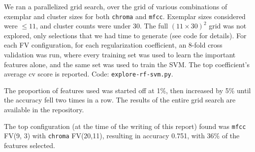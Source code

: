 \documentclass[9pt]{article}
\begin{document}
We ran a parallelized grid search, over the grid of various combinations of exemplar and cluster sizes for both \texttt{chroma} and \texttt{mfcc}. Exemplar sizes considered were $\le 11$, and cluster counts were under 30. The full $(11\times 30)^2$ grid was not explored, only selections that we had time to generate (see code for details). For each FV configuration, for each regularization coefficient, an 8-fold cross validation was run, where every training set was used to learn the important features alone, and the same set was used to train the SVM. The top coefficient's average cv score is reported. Code: \texttt{explore-rf-svm.py}.

The proportion of features used was started off at 1\%, then increased by 5\% until the accuracy fell two times in a row. The results of the entire grid search are available in the repository.

The top configuration (at the time of the writing of this report) found was \texttt{mfcc} FV(9, 3) with \texttt{chroma} FV(20,11), resulting in accuracy 0.751, with 36\% of the features selected.
\end{document}
